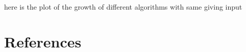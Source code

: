 \documentclass[
10pt, %
a4paper, %
oneside, %
headinclude,footinclude, %
BCOR5mm, %
]{scrartcl}
\begin{document}
here is the plot of the growth of different algorithms with same giving input






\section{References}




\label{fig:esempio}



\renewcommand{\refname}{\spacedlowsmallcaps{References}} %



 
\end{document}
